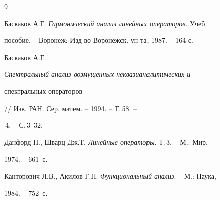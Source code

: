 \begin{thebibliography}{9}







Баскаков А.Г. {\em Гармонический анализ линейных операторов}. Учеб.


пособие. -- Воронеж: Изд-во Воронежск. ун-та, 1987. -- 164 с.




Баскаков А.Г. {\em Спектральный анализ возмущенных неквазианалитических и


спектральных операторов} // Изв. РАН. Сер. матем. -- 1994. -- Т.\,58. --


\No\,4. -- С.\,3--32.




Данфорд Н., Шварц Дж.Т. {\em Линейные операторы}. Т.\,3. -- М.: Мир,


1974. -- 661~с.




Канторович Л.В., Акилов Г.П. {\em Функциональный анализ}. -- М.: Наука,


1984. -- 752~с.





\end{thebibliography}





\vskip 2cm















